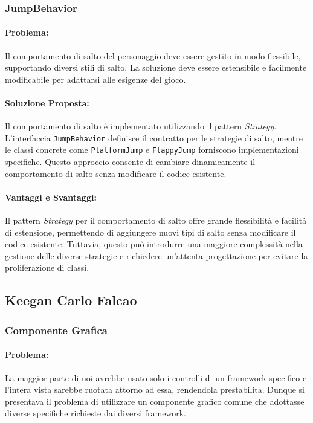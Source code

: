 \documentclass[a4paper,12pt]{report}
\begin{document}
	\subsubsection{JumpBehavior}
	
	\paragraph{Problema:} Il comportamento di salto del personaggio deve essere gestito in modo flessibile, supportando diversi stili di salto. La soluzione deve essere estensibile e facilmente modificabile per adattarsi alle esigenze del gioco.
	
	\paragraph{Soluzione Proposta:} Il comportamento di salto è implementato utilizzando il pattern \textit{Strategy}. L'interfaccia \texttt{JumpBehavior} definisce il contratto per le strategie di salto, mentre le classi concrete come \texttt{PlatformJump} e \texttt{FlappyJump} forniscono implementazioni specifiche. Questo approccio consente di cambiare dinamicamente il comportamento di salto senza modificare il codice esistente.
	
	\paragraph{Vantaggi e Svantaggi:} 
	Il pattern \textit{Strategy} per il comportamento di salto offre grande flessibilità e facilità di estensione, permettendo di aggiungere nuovi tipi di salto senza modificare il codice esistente. Tuttavia, questo può introdurre una maggiore complessità nella gestione delle diverse strategie e richiedere un'attenta progettazione per evitare la proliferazione di classi.
	
	\subsection{Keegan Carlo Falcao}
	
	\subsubsection{Componente Grafica}
	
	\paragraph{Problema:} La maggior parte di noi avrebbe usato solo i controlli di un framework specifico e l'intera vista sarebbe ruotata attorno ad essa, rendendola prestabilita. Dunque si presentava il problema di utilizzare un componente grafico comune che adottasse diverse specifiche richieste dai diversi framework.
	
\end{document}

